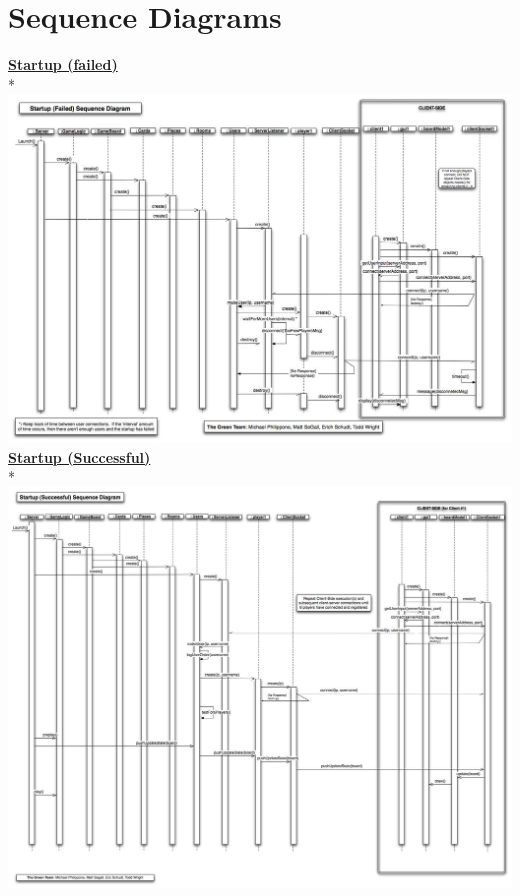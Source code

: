\part{Sequence Diagrams}
%
\newpage
%
\begin{flushleft}
	{\Large \underline{\textbf{Startup (failed)}}} \\*
	\includegraphics[angle=90,scale=.40]{../DesignDocumentation/08_SequenceDiagrams/startup_fail_fewClients.jpg} %
	\newpage 
%
	{\Large \underline{\textbf{Startup (Successful)}}} \\*
	\includegraphics[angle=90,scale=.35]{../DesignDocumentation/08_SequenceDiagrams/startup_success.jpg} %

\end{flushleft}
